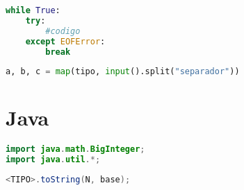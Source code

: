 \begin{lstlisting}[language=Python, title={Ler Até EOF}]
while True:
	try:
    	#codigo
    except EOFError:
    	break
\end{lstlisting}
\begin{lstlisting}[language=Python, title={Múltiplas Entradas na Mesma Linha}]
a, b, c = map(tipo, input().split("separador"))
\end{lstlisting}
\section{Java}
\begin{lstlisting}[language=Java, title={Bibliotecas importantes}]
import java.math.BigInteger;
import java.util.*;
\end{lstlisting}

\begin{lstlisting}[language=Java, title={Conversão de Base}]
<TIPO>.toString(N, base);
\end{lstlisting}